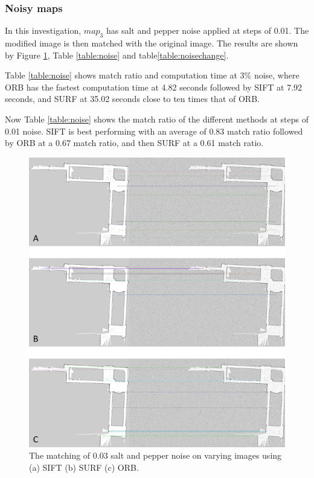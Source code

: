 \subsubsection{Noisy maps}
In this investigation, $map_3$ has salt and pepper noise applied at steps of 0.01. The modified image is then matched with the original image. The results are shown by Figure \ref{fig:noise}, Table \ref{table:noise} and table\ref{table:noisechange}. 

Table \ref{table:noise} shows match ratio and computation time at 3$\%$ noise, where ORB has the fastest computation time at 4.82 seconds followed by SIFT at 7.92 seconds, and SURF at 35.02 seconds close to ten times that of ORB.

Now Table \ref{table:noise} shows the match ratio of the different methods at steps of 0.01 noise. SIFT is best performing with an average of 0.83 match ratio followed by ORB at a 0.67 match ratio, and then SURF at a 0.61 match ratio.

\begin{figure}[H]
    \centering
    \includegraphics[width=1\textwidth]{figs/The_matching_of_noise_0_03.png}
    \caption{ The matching of 0.03 salt and pepper noise on varying images using (a) SIFT (b) SURF (c) ORB.}
    \label{fig:noise}
\end{figure}

